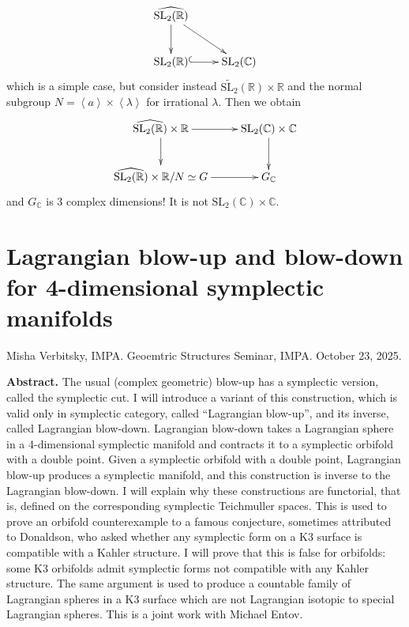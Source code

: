 \begin{example}
\label{example-complexification-groupoid}
$$
\xymatrix{
\widehat{\text{SL}_2(\mathbb{R})}\ar[d]
\ar[dr]\\
\text{SL}_2(\mathbb{R})\ar@{^{(}->}[r]&
\text{SL}_2(\mathbb{C})
}
$$
which is a simple case,
but consider instead
$\tilde{\text{SL}_2}(\mathbb{R})\times
\mathbb{R}$
and the normal subgroup
$N=\left\langle{}a\right\rangle{}\times \left\langle{}\lambda\right\rangle{}$
for irrational $\lambda$.
Then we obtain
$$
\xymatrix{
\widehat{\text{SL}_2(\mathbb{R})}
\times\mathbb{R}\ar[r]\ar[d]
&\text{SL}_2(\mathbb{C})\times\mathbb{C}
\ar[d]\\
\widehat{\text{SL}_2(\mathbb{R})}
\times\mathbb{R}/N\simeq
G\ar[r]&
G_\mathbb{C}
}
$$
and $G_\mathbb{C}$ is 3 complex dimensions!
It is not
$\text{SL}_2(\mathbb{C})\times\mathbb{C}$.
\end{example}

\section{Lagrangian blow-up and blow-down for
4-dimensional symplectic manifolds
}
\label{section-blow-up-down}

\noindent
Misha Verbitsky, IMPA.
Geoemtric Structures Seminar, IMPA.
October 23, 2025.

\medskip\noindent
{\bf Abstract.} The usual (complex geometric)
blow-up has a symplectic
version, called the symplectic cut. I will
introduce a variant of this
construction, which is valid only in
symplectic category, called ``Lagrangian
blow-up'', and its inverse, called Lagrangian
blow-down. Lagrangian blow-down
takes a Lagrangian sphere in a 4-dimensional
symplectic manifold and contracts
it to a symplectic orbifold with a double
point. Given a symplectic orbifold
with a double point, Lagrangian blow-up
produces a symplectic manifold, and this
construction is inverse to the Lagrangian
blow-down. I will explain why these
constructions are functorial, that is,
defined on the corresponding symplectic
Teichmuller spaces. This is used to prove an
orbifold counterexample to a famous
conjecture, sometimes attributed to
Donaldson, who asked whether any symplectic
form on a K3 surface is compatible with a
Kahler structure. I will prove that
this is false for orbifolds: some K3
orbifolds admit symplectic forms not
compatible with any Kahler structure. The
same argument is used to produce a
countable family of Lagrangian spheres in a
K3 surface which are not Lagrangian
isotopic to special Lagrangian spheres. This
is a joint work with Michael Entov.



